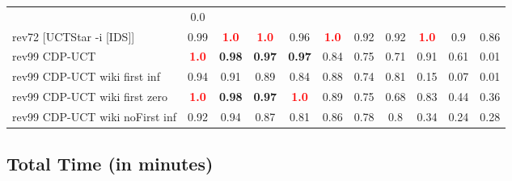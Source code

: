 \documentclass{article}
\begin{document}
\begin{tabular}{|l|r@{$\pm$}rr@{$\pm$}rr@{$\pm$}rr@{$\pm$}rr@{$\pm$}rr@{$\pm$}rr@{$\pm$}rr@{$\pm$}rr@{$\pm$}rr@{$\pm$}r|}
& \multicolumn{2}{c|}{0.0}
\\
rev72 [UCTStar -i [IDS]]
& \multicolumn{2}{c}{0.99}
& \multicolumn{2}{c}{\textbf{\textcolor{red}{1.0}}}
& \multicolumn{2}{c}{\textbf{\textcolor{red}{1.0}}}
& \multicolumn{2}{c}{0.96}
& \multicolumn{2}{c}{\textbf{\textcolor{red}{1.0}}}
& \multicolumn{2}{c}{0.92}
& \multicolumn{2}{c}{0.92}
& \multicolumn{2}{c}{\textbf{\textcolor{red}{1.0}}}
& \multicolumn{2}{c}{0.9}
& \multicolumn{2}{c|}{0.86}
\\
\hline
rev99 CDP-UCT
& \multicolumn{2}{c}{\textbf{\textcolor{red}{1.0}}}
& \multicolumn{2}{c}{\textbf{0.98}}
& \multicolumn{2}{c}{\textbf{0.97}}
& \multicolumn{2}{c}{\textbf{0.97}}
& \multicolumn{2}{c}{0.84}
& \multicolumn{2}{c}{0.75}
& \multicolumn{2}{c}{0.71}
& \multicolumn{2}{c}{0.91}
& \multicolumn{2}{c}{0.61}
& \multicolumn{2}{c|}{0.01}
\\
rev99 CDP-UCT wiki first inf
& \multicolumn{2}{c}{0.94}
& \multicolumn{2}{c}{0.91}
& \multicolumn{2}{c}{0.89}
& \multicolumn{2}{c}{0.84}
& \multicolumn{2}{c}{0.88}
& \multicolumn{2}{c}{0.74}
& \multicolumn{2}{c}{0.81}
& \multicolumn{2}{c}{0.15}
& \multicolumn{2}{c}{0.07}
& \multicolumn{2}{c|}{0.01}
\\
rev99 CDP-UCT wiki first zero
& \multicolumn{2}{c}{\textbf{\textcolor{red}{1.0}}}
& \multicolumn{2}{c}{\textbf{0.98}}
& \multicolumn{2}{c}{\textbf{0.97}}
& \multicolumn{2}{c}{\textbf{\textcolor{red}{1.0}}}
& \multicolumn{2}{c}{0.89}
& \multicolumn{2}{c}{0.75}
& \multicolumn{2}{c}{0.68}
& \multicolumn{2}{c}{0.83}
& \multicolumn{2}{c}{0.44}
& \multicolumn{2}{c|}{0.36}
\\
rev99 CDP-UCT wiki noFirst inf
& \multicolumn{2}{c}{0.92}
& \multicolumn{2}{c}{0.94}
& \multicolumn{2}{c}{0.87}
& \multicolumn{2}{c}{0.81}
& \multicolumn{2}{c}{0.86}
& \multicolumn{2}{c}{0.78}
& \multicolumn{2}{c}{0.8}
& \multicolumn{2}{c}{0.34}
& \multicolumn{2}{c}{0.24}
& \multicolumn{2}{c|}{0.28}
\\
\hline
\end{tabular}%

\bigskip

\subsection*{Total Time (in minutes)}
\end{document}
